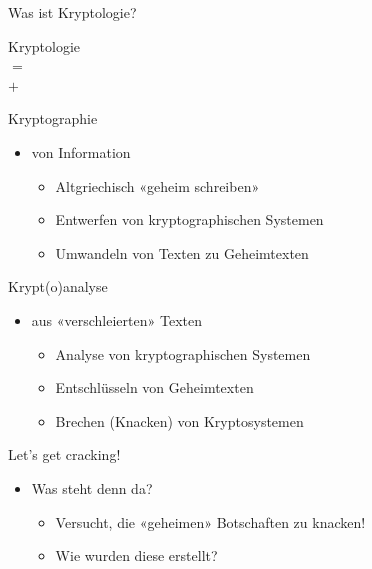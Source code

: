 \begin{frame}{Was ist Kryptologie?}
  \vfill
  \begin{center}
    \LARGE Kryptologie\\[2mm] $=$\\[2mm]  $+$ 
  \end{center}
  \vfill
\end{frame}

\begin{frame}[text=large]{Kryptographie}
  \begin{itemize}
    \item {} von Information
    \begin{itemize}
      \item Altgriechisch «geheim schreiben»
      \item Entwerfen von kryptographischen Systemen
      \item Umwandeln von Texten zu Geheimtexten
    \end{itemize}
  \end{itemize}
\end{frame}

\begin{frame}[text=large]{Krypt(o)analyse}
  \begin{itemize}
    \item {} aus «verschleierten» Texten 
    \begin{itemize}
      \item Analyse von kryptographischen Systemen
      \item Entschlüsseln von Geheimtexten
      \item Brechen (Knacken) von Kryptosystemen
    \end{itemize}
  \end{itemize}
\end{frame}

\begin{frame}[doit={zu zweit}, text=large]{Let's get cracking!}
  \begin{itemize}
    \item Was steht denn da?
    \begin{itemize}
      \item Versucht, die «geheimen» Botschaften zu knacken!
      \item Wie wurden diese erstellt?
    \end{itemize}
  \end{itemize}
\end{frame}

